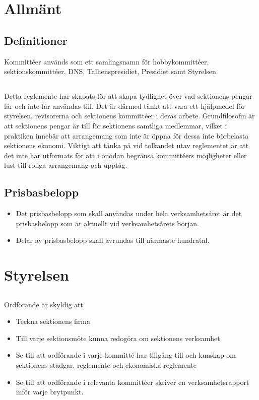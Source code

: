 \documentclass[a4paper, 10pt]{article}
\begin{document}
\newpage
\setcounter{tocdepth}{1}
\tableofcontents
\newpage

\section{Allmänt}
\subsection{Definitioner}
Kommittéer används som ett samlingsnamn för hobbykommittéer, sektionskommittéer, DNS, Talhenspresidiet, Presidiet samt Styrelsen.

\subsection{}
Detta reglemente har skapats för att skapa tydlighet över vad sektionens pengar får och inte får användas till. Det är därmed tänkt att vara ett hjälpmedel för styrelsen, revisorerna och sektionens kommittéer i deras arbete. Grundfilosofin är att sektionens pengar är till för sektionens samtliga medlemmar, vilket i praktiken innebär att arrangemang som inte är öppna för dessa inte börbelasta sektionens ekonomi. Viktigt att tänka på vid tolkandet utav reglementet är att det inte har utformats för att i onödan begränsa kommittéers möjligheter eller lust till roliga arrangemang och upptåg.
\subsection{Prisbasbelopp}
\begin{itemize}
  \item Det prisbasbelopp som skall användas under hela verksamhetsåret är det prisbasbelopp som är aktuellt vid verksamhetsårets början.
  \item Delar av prisbasbelopp skall avrundas till närmaste hundratal.
\end{itemize}
\section{Styrelsen}
\subsection{}
Ordförande är skyldig att
\begin{itemize}
  \item Teckna sektionens firma
  \item Till varje sektionsmöte kunna redogöra om sektionens verksamhet
  \item Se till att ordförande i varje kommitté har tillgång till och kunskap om sektionens stadgar, reglemente och ekonomiska reglemente
  \item Se till att ordförande i relevanta kommittéer skriver en verksamhetsrapport inför varje brytpunkt.
\end{itemize}
\end{document}
